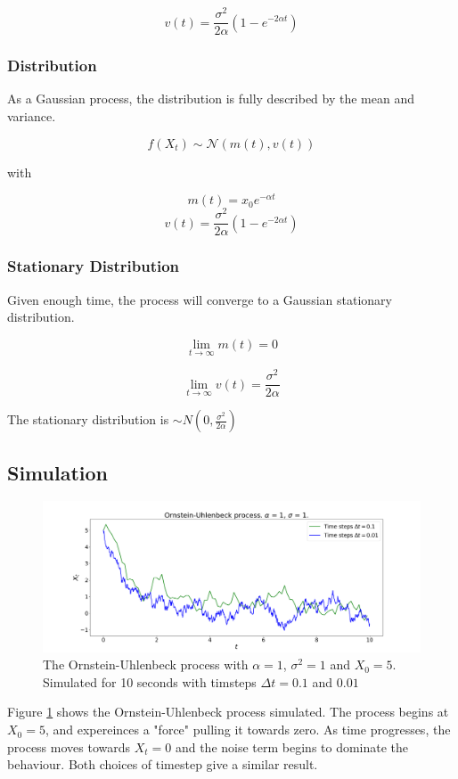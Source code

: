 \documentclass{article}
\begin{document}
$$ v(t) = \frac{\sigma^2}{2 \alpha}(1-e^{-2 \alpha t})$$

\subsubsection{Distribution}

As a Gaussian process, the distribution is fully described by the mean and variance.

$$f(X_t) \sim \mathcal{N}(m(t), v(t))$$

with

$$m(t) = x_0 e^{-\alpha t}$$
$$ v(t) = \frac{\sigma^2}{2 \alpha}(1-e^{-2 \alpha t})$$


\subsubsection{Stationary Distribution}

Given enough time, the process will converge to a Gaussian stationary distribution.  

$$\lim_{t \to \infty} m(t) = 0$$

$$\lim_{t \to \infty} v(t) = \frac{\sigma^2}{2 \alpha}$$

The stationary distribution is $\sim N(0,\frac{\sigma^2}{2 \alpha})$ 

\subsection{Simulation}

\begin{figure}[H]
\includegraphics[scale=0.25]{ou_process_a.png} 
\caption{The Ornstein-Uhlenbeck process with $\alpha=1$, $\sigma^2=1$ and $X_0 = 5$. Simulated for 10 seconds with timsteps $\Delta t =0.1$ and $0.01$}
\label{fig:ou_process}
\end{figure}

Figure \ref{fig:ou_process} shows the Ornstein-Uhlenbeck process simulated. The process begins at $X_0=5$, and expereinces a "force" pulling it towards zero. As time progresses, the process moves towards $X_t=0$ and the noise term begins to dominate the behaviour. Both choices of timestep give a similar result.
\end{document}
